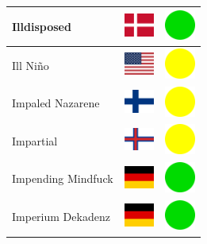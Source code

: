 \documentclass[12pt, a4paper, twoside]{report}
\begin{document}
\begin{center}
\begin{longtable}{|p{5cm}|p{2cm}|p{2cm}|}
Illdisposed & \includegraphics[width=1cm]{4x3/dk} & \includegraphics[width=1cm]{likes/y} \\ \hline
Ill Niño & \includegraphics[width=1cm]{4x3/us} & \includegraphics[width=1cm]{likes/m} \\ \hline
Impaled Nazarene & \includegraphics[width=1cm]{4x3/fi} & \includegraphics[width=1cm]{likes/m} \\ \hline
Impartial & \includegraphics[width=1cm]{4x3/fo} & \includegraphics[width=1cm]{likes/m} \\ \hline
Impending Mindfuck & \includegraphics[width=1cm]{4x3/de} & \includegraphics[width=1cm]{likes/y} \\ \hline
Imperium Dekadenz & \includegraphics[width=1cm]{4x3/de} & \includegraphics[width=1cm]{likes/y} \\ \hline

\end{longtable}
\end{center}
\end{document}
